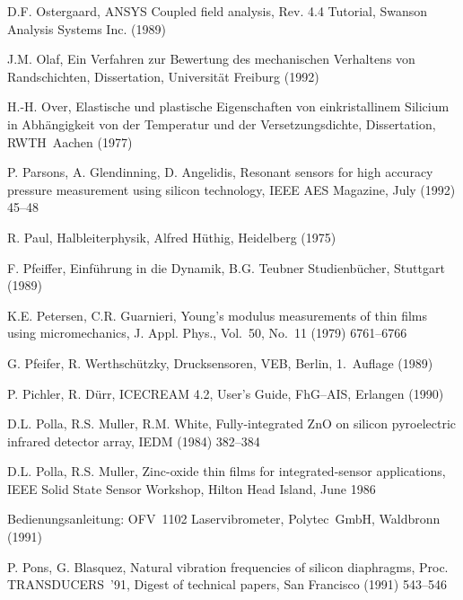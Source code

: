 \begin{thebibliography}{xxx}
 D.F. Ostergaard, {\sf ANSYS} Coupled field analysis, Rev. 4.4 Tutorial,
 Swanson Analysis Systems Inc. (1989)

 J.M. Olaf, Ein Verfahren zur Bewertung des mechanischen Verhaltens von
 Randschichten, Dissertation, Universität Freiburg (1992)

 H.-H. Over, Elastische und plastische Eigenschaften von einkristallinem
 Silicium in Abhängigkeit von der Temperatur und der Versetzungsdichte,
 Dissertation, RWTH~Aachen (1977)

 P. Parsons, A. Glendinning, D. Angelidis, Resonant sensors for high accuracy
 pressure measurement using silicon technology, IEEE AES Magazine,
 July (1992) 45--48

 R. Paul, Halbleiterphysik, Alfred Hüthig, Heidelberg (1975)

  F. Pfeiffer, Einführung in die Dynamik, B.G. Teubner Studienbücher,
  Stuttgart (1989)

 K.E. Petersen, C.R. Guarnieri, Young's modulus measurements of thin films
 using micromechanics, J. Appl. Phys., Vol.~50, No.~11 (1979) 6761--6766


 G. Pfeifer, R. Werthschützky, Drucksensoren, VEB, Berlin,
 1.~Auflage (1989)

 P. Pichler, R. Dürr, {\sf ICECREAM} 4.2, User's Guide, FhG--AIS,
 Erlangen (1990)

 D.L. Polla, R.S. Muller, R.M. White, Fully-integrated ZnO on silicon
 pyroelectric infrared detector array, IEDM (1984) 382--384

 D.L. Polla, R.S. Muller, Zinc-oxide thin films for integrated-sensor
 applications, IEEE Solid State Sensor Workshop, Hilton Head Island,
 June 1986

 Bedienungsanleitung: OFV~1102 Laservibrometer, Polytec~GmbH,
 Waldbronn (1991)

 P. Pons, G. Blasquez, Natural vibration frequencies of silicon diaphragms,
 Proc. TRANSDUCERS~'91, Digest of technical papers, San Francisco
 (1991) 543--546


\end{thebibliography}

